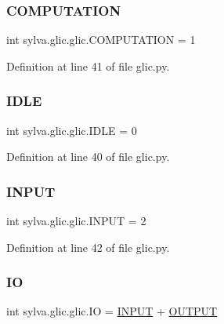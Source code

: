 \subsubsection{\texorpdfstring{C\+O\+M\+P\+U\+T\+A\+T\+I\+ON}{COMPUTATION}}
{\footnotesize\ttfamily int sylva.\+glic.\+glic.\+C\+O\+M\+P\+U\+T\+A\+T\+I\+ON = 1}



Definition at line 41 of file glic.\+py.

\mbox{\label{namespacesylva_1_1glic_1_1glic_ada3197b7ecf6f2b781f0f358b482a2b4}} 
\subsubsection{\texorpdfstring{I\+D\+LE}{IDLE}}
{\footnotesize\ttfamily int sylva.\+glic.\+glic.\+I\+D\+LE = 0}



Definition at line 40 of file glic.\+py.

\mbox{\label{namespacesylva_1_1glic_1_1glic_ab7e66a35c60e9c2fbeb69191240a7dc9}} 
\subsubsection{\texorpdfstring{I\+N\+P\+UT}{INPUT}}
{\footnotesize\ttfamily int sylva.\+glic.\+glic.\+I\+N\+P\+UT = 2}



Definition at line 42 of file glic.\+py.

\mbox{\label{namespacesylva_1_1glic_1_1glic_a9c96f3856c9e68f1b545a0f7ee5b68fa}} 
\subsubsection{\texorpdfstring{IO}{IO}}
{\footnotesize\ttfamily int sylva.\+glic.\+glic.\+IO = \hyperlink{namespacesylva_1_1glic_1_1glic_ab7e66a35c60e9c2fbeb69191240a7dc9}{I\+N\+P\+UT} + \hyperlink{namespacesylva_1_1glic_1_1glic_ad6e11d2ff626d576dddd38f99952a31a}{O\+U\+T\+P\+UT}}



